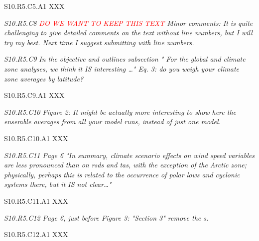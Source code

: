 \documentclass[a4paper,10pt]{article}
\newcommand{\ed}[1]{\textcolor{red}{#1}}
\begin{document}
	S10.R5.C5.A1 XXX

	
	\emph{S10.R5.C8 \ed{DO WE WANT TO KEEP THIS TEXT} Minor comments: It is quite challenging to give detailed comments on the text without line numbers, but I will try my best. Next time I suggest submitting with line numbers.}

	\emph{S10.R5.C9 In the objective and outlines subsection " For the global and climate zone analyses, we think it IS interesting …" Eq. 3: do you weigh your climate zone averages by latitude?}

	S10.R5.C9.A1 XXX

	\emph{S10.R5.C10 Figure 2: It might be actually more interesting to show here the ensemble averages from all your model runs, instead of just one model.}

	S10.R5.C10.A1 XXX

	\emph{S10.R5.C11 Page 6 "In summary, climate scenario effects on wind speed variables are less pronounced than on rsds and tas, with the exception of the Arctic zone; physically, perhaps this is related to the occurrence of polar lows and cyclonic systems there, but it IS not clear…"}

	S10.R5.C11.A1 XXX

	\emph{S10.R5.C12 Page 6, just before Figure 3: "Section 3" remove the s.}

	S10.R5.C12.A1 XXX



	
	
	
\end{document}

